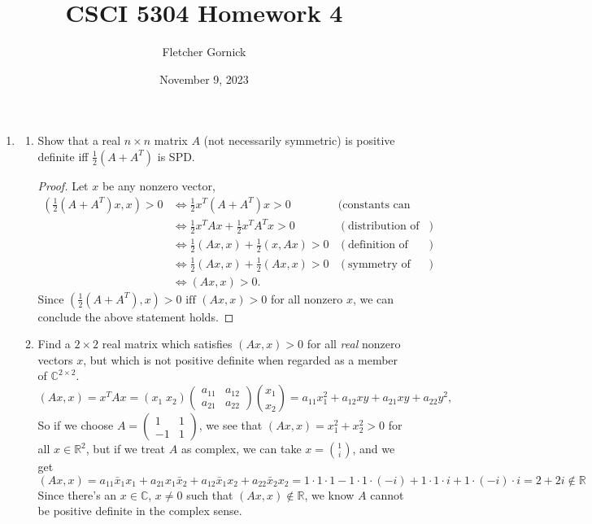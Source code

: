 \documentclass[11pt]{article}
\title{\vspace{-1.0cm}CSCI 5304 Homework 4}
\author{Fletcher Gornick}
\date{November 9, 2023}
\newcommand{\R}{\mathbb{R}}
\newcommand{\C}{\mathbb{C}}
\newcommand{\n}{\vspace{0.3cm}}
\begin{document}
\maketitle
\begin{enumerate}
	\item \begin{enumerate}
		      \item Show that a real \(n \times n\) matrix \(A\) (not necessarily symmetric) is positive definite iff \(\frac12(A + A^T)\) is SPD.
		            \begin{proof}
			            Let \(x\) be any nonzero vector,
			            \begin{align*}
				            \left(\frac12(A + A^T)x, x \right) > 0
				             & \iff \frac12 x^T(A + A^T)x > 0              & \text{(constants can be pulled out)} \\
				             & \iff \frac12 x^T Ax + \frac12 x^T A^T x > 0 & (\text{distribution of vectors})     \\
				             & \iff \frac12(Ax, x) + \frac12(x, Ax) > 0    & (\text{definition of inner product}) \\
				             & \iff \frac12(Ax, x) + \frac12(Ax, x) > 0    & (\text{symmetry of inner product})   \\
				             & \iff (Ax, x) > 0.
			            \end{align*}
			            Since \(\left(\frac12 (A + A^T),x \right) > 0 \text{ iff } (Ax,x) > 0\) for all nonzero \(x\), we can conclude the above statement holds.
		            \end{proof}

		      \item Find a \(2 \times 2\) real matrix which satisfies \((Ax,x) > 0\) for all \textit{real} nonzero vectors \(x\), but which is not positive definite when regarded as a member of \(\C^{2 \times 2}\).
		            \[(Ax,x) = x^TAx = (x_1 \; x_2) \begin{pmatrix} a_{11} & a_{12} \\ a_{21} & a_{22} \end{pmatrix} \binom{x_1}{x_2} = a_{11}x_1^2 + a_{12}xy + a_{21}xy + a_{22}y^2,\]
		            So if we choose \(A = \begin{pmatrix} 1 & 1 \\ -1 & 1 \end{pmatrix}\), we see that \((Ax,x) = x_1^2 + x_2^2 > 0\) for all \(x \in \R^2\), but if we treat \(A\) as complex, we can take \(x = \binom1i\), and we get
		            \[(Ax,x) = a_{11} \bar x_1 x_1 + a_{21} x_1 \bar x_2 + a_{12} \bar x_1 x_2 + a_{22} \bar x_2 x_2 = 1 \cdot 1 \cdot 1 -1 \cdot 1 \cdot (-i) + 1 \cdot 1 \cdot i + 1 \cdot (-i) \cdot i = 2 + 2i \not \in \R\]
		            Since there's an \(x \in \C\), \(x \neq 0\) such that \((Ax,x) \not \in \R\), we know \(A\) cannot be positive definite in the complex sense.
	      \end{enumerate} \n


\end{enumerate}
\end{document}
